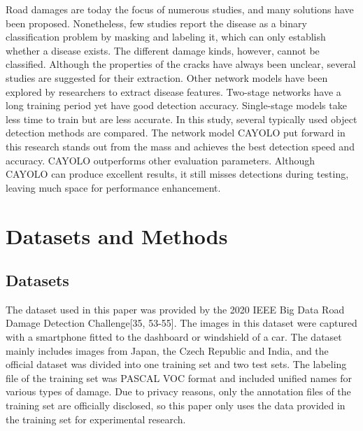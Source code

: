 \documentclass[sensors,article,submit,moreauthors]{Definitions/mdpi}
\begin{document}
    Road damages are today the focus of numerous studies, and many solutions have been proposed. Nonetheless, few studies report the disease as a binary classification problem by masking and labeling it, which can only establish whether a disease exists. The different damage kinds, however, cannot be classified. Although the properties of the cracks have always been unclear, several studies are suggested for their extraction. Other network models have been explored by researchers to extract disease features. Two-stage networks have a long training period yet have good detection accuracy. Single-stage models take less time to train but are less accurate. In this study, several typically used object detection methods are compared. The network model CAYOLO put forward in this research stands out from the mass and achieves the best detection speed and accuracy. CAYOLO outperforms other evaluation parameters. Although CAYOLO can produce excellent results, it still misses detections during testing, leaving much space for performance enhancement.




    \section{Datasets and Methods}

    \subsection{Datasets}

    The dataset used in this paper was provided by the 2020 IEEE Big Data Road Damage Detection Challenge[35, 53-55]\citep{maeda2021generative,arya2021deep,arya2021rdd2020,arya2020global}. The images in this dataset were captured with a smartphone fitted to the dashboard or windshield of a car. The dataset mainly includes images from Japan, the Czech Republic and India, and the official dataset was divided into one training set and two test sets. The labeling file of the training set was PASCAL VOC format and included unified names for various types of damage. Due to privacy reasons, only the annotation files of the training set are officially disclosed, so this paper only uses the data provided in the training set for experimental research.
\end{document}
